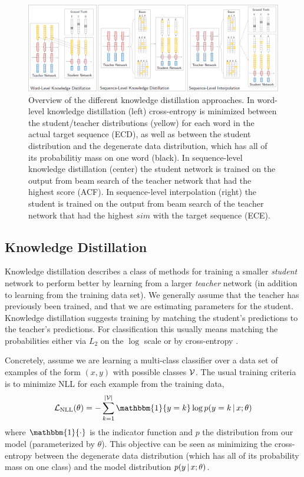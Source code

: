 \documentclass[11pt,letterpaper]{article}
\begin{document}
\begin{figure}[htp]\label{fig1}
\centering
\includegraphics[width=16.5cm]{kd-overview}
\caption{Overview of the different knowledge distillation approaches.
In word-level knowledge distillation (left) cross-entropy is minimized between the
  student/teacher distributions (yellow) for each word in the actual target sequence (\textsf{ECD}), as well as
  between the student distribution and the degenerate data distribution, which has all of its
  probabilitiy mass on one word (black). In sequence-level knowledge distillation (center)
  the student network is trained on the output from beam search of the teacher network that
  had the highest score (\textsf{ACF}). In sequence-level interpolation (right) the student is trained on the output
 from beam search of the teacher network that had the highest $sim$ with the target sequence (\textsf{ECE}).}
\end{figure}
\subsection{Knowledge Distillation}\label{KD}

Knowledge distillation describes a class of methods for training a
smaller \textit{student} network to perform better by learning from a
larger \textit{teacher} network (in addition to learning from the
training data set). We generally assume that the teacher has previously
been trained, and that we are estimating parameters for the student.
Knowledge distillation suggests training by matching the student's
predictions to the teacher's predictions. For classification this
usually means matching the probabilities either via $L_2$ on the
$\log$ scale \cite{Ba2014} or by cross-entropy
\cite{Li2014,Hinton2015}.

Concretely, assume we are learning a multi-class classifier over 
 a data set of examples of the form $(x, y)$ 
with possible classes $\mathcal{V}$. The usual training criteria is to minimize NLL for each example 
from the 
training data,  
\begin{equation*}
\mcL_{\text{NLL}}(\theta) =  -  \sum_{k=1}^{|\mcV|} \mathbbm{1}\{y=k\} \log p(y=k \given x;\theta)
\end{equation*}
where $\mathbbm{1}\{\cdot\}$ is the indicator function and $p$ the
distribution from our model (parameterized by $\theta$). This objective can be seen
as minimizing the cross-entropy between the degenerate data
distribution (which has all of its probability mass on one class) and
the model distribution $p(y \,|\, x;\theta)$.
\end{document}
